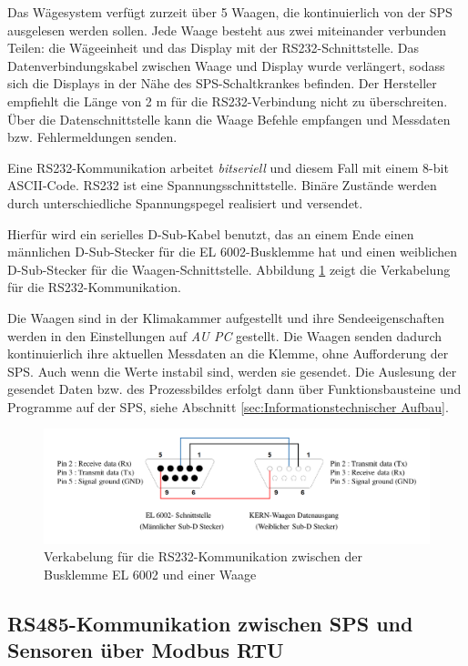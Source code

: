 Das Wägesystem verfügt zurzeit über 5 Waagen, die kontinuierlich von der SPS ausgelesen werden sollen. Jede Waage besteht aus zwei miteinander verbunden Teilen: die Wägeeinheit und das Display mit der RS232-Schnittstelle. Das Datenverbindungskabel zwischen Waage und Display wurde verlängert, sodass sich die Displays in der Nähe des SPS-Schaltkrankes befinden. Der Hersteller empfiehlt die Länge von 2 m für die RS232-Verbindung nicht zu überschreiten.  
Über die Datenschnittstelle kann die Waage Befehle empfangen und Messdaten bzw. Fehlermeldungen senden. 

Eine RS232-Kommunikation arbeitet \textit{bitseriell} und diesem Fall mit einem 8-bit ASCII-Code. RS232 ist eine Spannungsschnittstelle. Binäre Zustände werden durch unterschiedliche Spannungspegel realisiert und versendet. \citep{Schleicher2005}

Hierfür wird ein serielles D-Sub-Kabel benutzt, das an einem Ende einen männlichen D-Sub-Stecker für die EL 6002-Busklemme hat und einen weiblichen D-Sub-Stecker für die Waagen-Schnittstelle. Abbildung \ref{fig:RS232} zeigt die Verkabelung für die RS232-Kommunikation. 

Die Waagen sind in der Klimakammer aufgestellt und ihre Sendeeigenschaften  werden in den Einstellungen auf \textit{AU PC} gestellt. Die Waagen senden dadurch kontinuierlich ihre aktuellen Messdaten an die Klemme, ohne Aufforderung der SPS. Auch wenn die Werte instabil sind, werden sie gesendet. Die Auslesung der gesendet Daten bzw. des Prozessbildes erfolgt dann über Funktionsbausteine und Programme auf der SPS, siehe Abschnitt \ref{sec:Informationstechnischer Aufbau}.


\begin{figure}[htb]
\centering		\includegraphics[width=1.05\textwidth]{Pictures/RS232_Verkabelung.pdf}
\caption{Verkabelung für die RS232-Kommunikation zwischen der Busklemme EL 6002 und einer Waage }
\label{fig:RS232}
\end{figure}


\subsection{RS485-Kommunikation zwischen SPS und Sensoren über Modbus RTU}
\label{subsec:Modbus}

